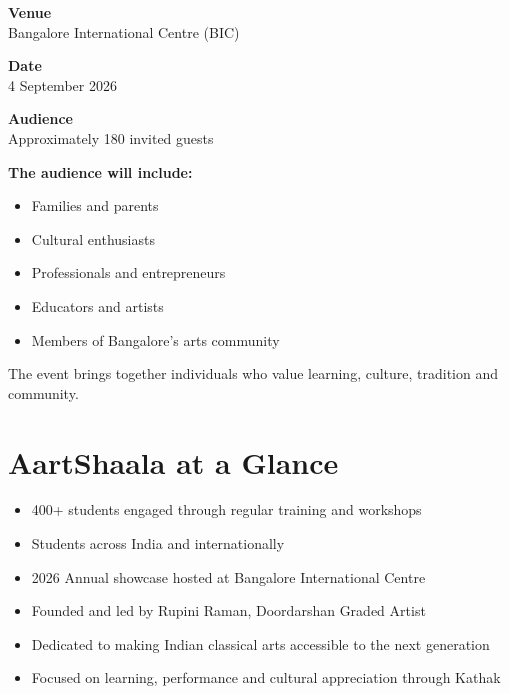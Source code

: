 \documentclass[12pt,a4paper]{article}
\begin{document}
\noindent
\begin{minipage}[t]{0.44\textwidth}
  \textbf{\color{aartOrange}Venue}\\[0.4em]
  Bangalore International Centre (BIC)

  \bigskip
  \textbf{\color{aartOrange}Date}\\[0.4em]
  4 September 2026

  \bigskip
  \textbf{\color{aartOrange}Audience}\\[0.4em]
  Approximately 180 invited guests
\end{minipage}%
\hfill
\begin{minipage}[t]{0.52\textwidth}
  \textbf{\color{aartOrange}The audience will include:}
  \begin{itemize}
    \item Families and parents
    \item Cultural enthusiasts
    \item Professionals and entrepreneurs
    \item Educators and artists
    \item Members of Bangalore's arts community
  \end{itemize}
\end{minipage}

\medskip
The event brings together individuals who value learning, culture, tradition and community.

\section*{AartShaala at a Glance}

\begin{itemize}
  \item 400+ students engaged through regular training and workshops
  \item Students across India and internationally
  \item 2026 Annual showcase hosted at Bangalore International Centre
  \item Founded and led by Rupini Raman, Doordarshan Graded Artist
  \item Dedicated to making Indian classical arts accessible to the next generation
  \item Focused on learning, performance and cultural appreciation through Kathak
\end{itemize}
\end{document}
